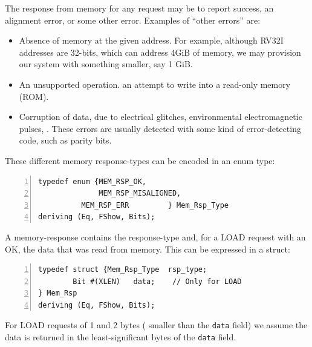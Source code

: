 
The response from memory for any request may be to report success, an
alignment error, or some other error.  Examples of ``other errors''
are:

\begin{itemize}

\item Absence of memory at the given address.  For example, although
  RV32I addresses are 32-bits, which can address 4GiB of memory, we
  may provision our system with something smaller, say 1 GiB.

\item An unsupported operation. {\Eg} an attempt to write into a
  read-only memory (ROM).

\item Corruption of data, due to electrical glitches, environmental
  electromagnetic pulses, {\etc}.  These errors are usually detected
  with some kind of error-detecting code, such as parity bits.

\end{itemize}

These different memory response-types can be encoded in an enum type:

\begin{Verbatim}[frame=single, numbers=left]
typedef enum {MEM_RSP_OK,
              MEM_RSP_MISALIGNED,
	      MEM_RSP_ERR         } Mem_Rsp_Type
deriving (Eq, FShow, Bits);
\end{Verbatim}

A memory-response contains the response-type and, for a LOAD request
with an OK, the data that was read from memory.  This can be expressed
in a struct:

\begin{Verbatim}[frame=single, numbers=left]
typedef struct {Mem_Rsp_Type  rsp_type;
		Bit #(XLEN)   data;    // Only for LOAD
} Mem_Rsp
deriving (Eq, FShow, Bits);
\end{Verbatim}

For LOAD requests of 1 and 2 bytes ({\ie} smaller than the \verb|data|
field) we assume the data is returned in the least-significant bytes
of the \verb|data| field.

